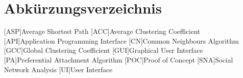 \chapter*{Abkürzungsverzeichnis}

\begin{acronym}[nonumberlist]
    [ASP]{Average Shortest Path}
    [ACC]{Average Clustering Coefficient}
    [API]{Application Programming Interface}
    [CN]{Common Neighbours Algorithm}
    [GCC]{Global Clustering Coefficient}
    [GUI]{Graphical User Interface}
    [PA]{Preferential Attachment Algorithm}
    [POC]{Proof of Concept}
    [SNA]{Social Network Analysis}
    [UI]{User Interface}
\end{acronym}
